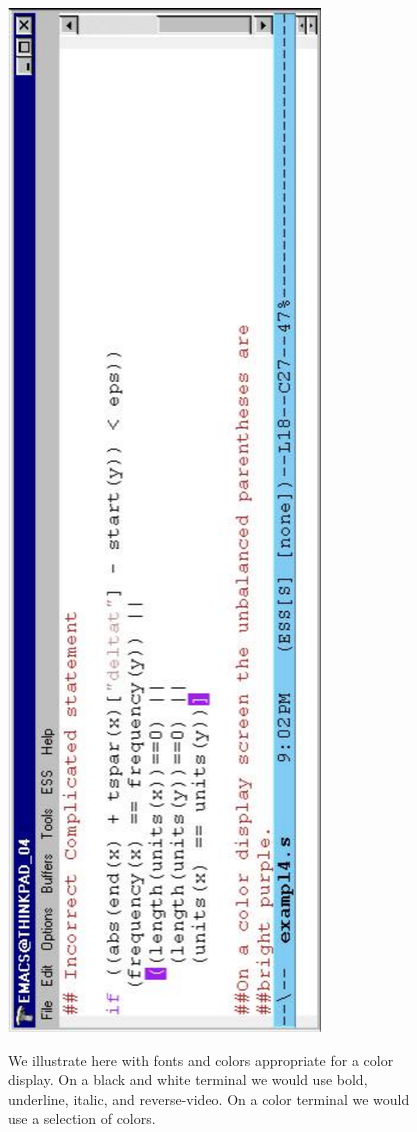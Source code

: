 \documentclass{article}
\def\url#1{\stexttt{#1}} %
\newcommand{\stexttt}[1]{{\small\texttt{#1}}}
\begin{document}
\begin{figure}[tbp]
{    \includegraphics[angle=270,width=\textwidth]{font-incor-s}%
    }
  \caption{We illustrate here with fonts and colors appropriate for a
    color display.  On a black and white terminal we would use bold,
    underline, italic, and reverse-video.  On a color terminal we
    would use a selection of colors.}
  \label{f.font}
\end{figure}
\end{document}
